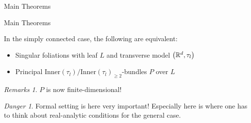 \documentclass[
aspectratio=3218, 
10pt
]{beamer}
\theoremstyle{plain}
\theoremstyle{remark}
\newtheorem*{remark}{Remarks}
\newtheorem*{danger}{Danger}
\begin{document}
{\begin{frame}{Main Theorems}
\begin{center}
\end{center}

\end{frame}

\begin{frame}{Main Theorems}
\begin{theorem}[{[C.\ L.-G., S.-R.\ F.]}]\vspace{.5pt}
In the simply connected case, the following are equivalent:
\begin{itemize}
	\item Singular foliations with leaf $L$ and transverse model $\mleft(\mathbb{R}^d, \tau_l\mright)$
	\item Principal $\mathrm{Inner}(\tau_l)/\mathrm{Inner}(\tau_l)_{\geq 2}$-bundles $P$ over $L$
\end{itemize}
\end{theorem}

\pause

\begin{remark}
$P$ is now finite-dimensional!
\end{remark}
\pause
\begin{danger}
Formal setting is here very important! Especially here is where one has to think about real-analytic conditions for the general case.
\end{danger}

\end{frame}
}

\end{document}
